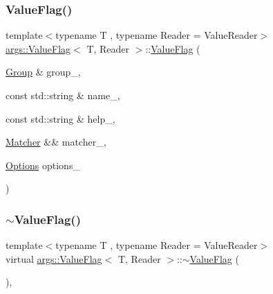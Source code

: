 \mbox{\label{classargs_1_1_value_flag_ad3126eb9ac5c936e8ed9c4652796bf1c}} 
\subsubsection{\texorpdfstring{Value\+Flag()}{ValueFlag()}\hspace{0.1cm}{\footnotesize\ttfamily [3/3]}}
{\footnotesize\ttfamily template$<$typename T , typename Reader  = Value\+Reader$>$ \\
\hyperlink{classargs_1_1_value_flag}{args\+::\+Value\+Flag}$<$ T, Reader $>$\+::\hyperlink{classargs_1_1_value_flag}{Value\+Flag} (\begin{DoxyParamCaption}\item[{\hyperlink{classargs_1_1_group}{Group} \&}]{group\+\_\+,  }\item[{const std\+::string \&}]{name\+\_\+,  }\item[{const std\+::string \&}]{help\+\_\+,  }\item[{\hyperlink{classargs_1_1_matcher}{Matcher} \&\&}]{matcher\+\_\+,  }\item[{\hyperlink{namespaceargs_aa530c0f95194aa275f49a5f299ac9e77}{Options}}]{options\+\_\+ }\end{DoxyParamCaption})\hspace{0.3cm}{\ttfamily [inline]}}

\mbox{\label{classargs_1_1_value_flag_a17daaa10bc9b93dfc8788a35e1368d24}} 
\subsubsection{\texorpdfstring{$\sim$\+Value\+Flag()}{~ValueFlag()}}
{\footnotesize\ttfamily template$<$typename T , typename Reader  = Value\+Reader$>$ \\
virtual \hyperlink{classargs_1_1_value_flag}{args\+::\+Value\+Flag}$<$ T, Reader $>$\+::$\sim$\hyperlink{classargs_1_1_value_flag}{Value\+Flag} (\begin{DoxyParamCaption}{ }\end{DoxyParamCaption})\hspace{0.3cm}{\ttfamily [inline]}, {\ttfamily [virtual]}}



